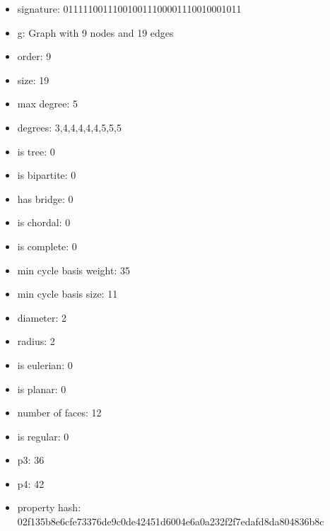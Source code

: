 \newpage
\begin{figure}
\end{figure}
\begin{itemize}
\item signature: 011111001110010011100001110010001011
\item g: Graph with 9 nodes and 19 edges
\item order: 9
\item size: 19
\item max degree: 5
\item degrees: 3,4,4,4,4,4,5,5,5
\item is tree: 0
\item is bipartite: 0
\item has bridge: 0
\item is chordal: 0
\item is complete: 0
\item min cycle basis weight: 35
\item min cycle basis size: 11
\item diameter: 2
\item radius: 2
\item is eulerian: 0
\item is planar: 0
\item number of faces: 12
\item is regular: 0
\item p3: 36
\item p4: 42
\item property hash: 02f135b8e6cfe73376de9c0de42451d6004e6a0a232f2f7edafd8da804836b8c
\end{itemize}
